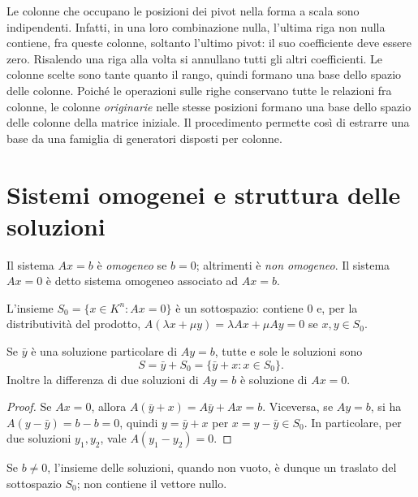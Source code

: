 \begin{osservazione}
Le colonne che occupano le posizioni dei pivot nella forma a scala sono indipendenti. Infatti, in una loro combinazione nulla, l’ultima riga non nulla contiene, fra queste colonne, soltanto l’ultimo pivot: il suo coefficiente deve essere zero. Risalendo una riga alla volta si annullano tutti gli altri coefficienti. Le colonne scelte sono tante quanto il rango, quindi formano una base dello spazio delle colonne. Poiché le operazioni sulle righe conservano tutte le relazioni fra colonne, le colonne \emph{originarie} nelle stesse posizioni formano una base dello spazio delle colonne della matrice iniziale. Il procedimento permette così di estrarre una base da una famiglia di generatori disposti per colonne.
\end{osservazione}

\section{Sistemi omogenei e struttura delle soluzioni}
\begin{definizione}
Il sistema $Ax=b$ è \emph{omogeneo} se $b=0$; altrimenti è \emph{non omogeneo}. Il sistema $Ax=0$ è detto sistema omogeneo associato ad $Ax=b$.
\end{definizione}
L'insieme $S_0=\{x\in K^n:Ax=0\}$ è un sottospazio: contiene $0$ e, per la distributività del prodotto, $A(\lambda x+\mu y)=\lambda Ax+\mu Ay=0$ se $x,y\in S_0$.

\begin{proposizione}
Se $\bar y$ è una soluzione particolare di $Ay=b$, tutte e sole le soluzioni sono
\[
 S=\bar y+S_0=\{\bar y+x:x\in S_0\}.
\]
Inoltre la differenza di due soluzioni di $Ay=b$ è soluzione di $Ax=0$.
\end{proposizione}
\begin{proof}
Se $Ax=0$, allora $A(\bar y+x)=A\bar y+Ax=b$. Viceversa, se $Ay=b$, si ha $A(y-\bar y)=b-b=0$, quindi $y=\bar y+x$ per $x=y-\bar y\in S_0$. In particolare, per due soluzioni $y_1,y_2$, vale $A(y_1-y_2)=0$.
\end{proof}
Se $b\ne0$, l'insieme delle soluzioni, quando non vuoto, è dunque un traslato del sottospazio $S_0$; non contiene il vettore nullo.

